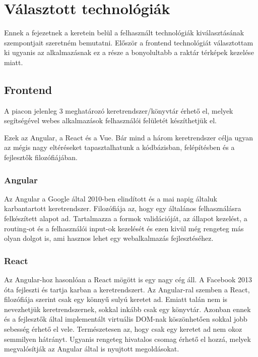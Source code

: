 \chapter{Választott technológiák}

Ennek a fejezetnek a keretein belül a felhasznált technológiák kiválasztásának szempontjait szeretném bemutatni. 
Először a frontend technológiát választottam ki ugyanis az alkalmazásnak ez a része a bonyolultabb a raktár térképek kezelése miatt.

\section{Frontend}

A piacon jelenleg 3 meghatározó keretrendszer/könyvtár érhető el, melyek segítségével webes alkalmazások felhasználói felületét készíthetjük el.

Ezek az Angular, a React és a Vue. 
Bár mind a három keretrendszer célja ugyan az mégis nagy eltéréseket tapasztalhatunk a kódbázisban, felépítésben és a fejlesztők filozófiájában.

\subsection{Angular}

Az Angular a Google által 2010-ben elindított és a mai napig általuk karbantartott keretrendszer.
Filozófiája az, hogy egy általános felhasználásra felkészített alapot ad. 
Tartalmazza a formok validációját, az állapot kezelést, a routing-ot és a felhasználói input-ok kezelését és ezen kivül még rengeteg más olyan dolgot is, ami hasznos lehet egy webalkalmazás fejlesztéséhez.

\subsection{React}

Az Angular-hoz hasonlóan a React mögött is egy nagy cég áll.
A Facebook 2013 óta fejleszti és tartja karban a keretrendszert.
Az Angular-ral szemben a React, filozófiája szerint csak egy könnyű sulyú keretet ad. 
Emiatt talán nem is nevezhetjük keretrendszernek, sokkal inkább csak egy könyvtár. 
Azonban ennek és a fejlesztők által implementált virtuális DOM-nak köszönhetően sokkal jobb sebesség érhető el vele.
Természetesen az, hogy csak egy keretet ad nem okoz semmilyen hátrányt.
Ugyanis rengeteg hivatalos csomag érhető el hozzá, melyek megvalósítják az Angular által is nyujtott megoldásokat.

